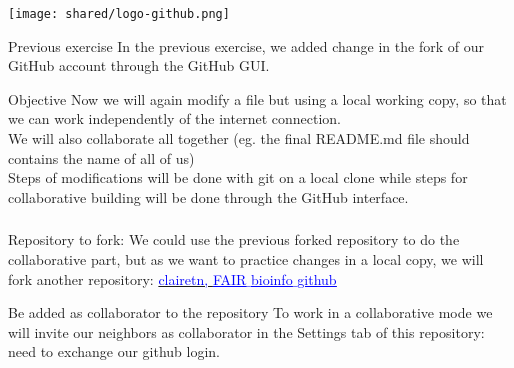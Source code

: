 \begin{frame}{\texttt{[image: shared/logo-github.png]}}
\begin{exampleblock}{Previous exercise}
In the previous exercise, we added change in the fork of our GitHub account through the GitHub GUI.
\end{exampleblock}
\begin{exampleblock}{Objective}
Now we will again modify a file but using a local working copy, so that we can work independently of the internet connection.\\
We will also collaborate all together (eg. the final README.md file should contains the name of all of us) \\
\vfill
Steps of modifications will be done with git on a local clone while steps for collaborative building will be done through the GitHub interface.
\end{exampleblock}
\end{frame}
\begin{frame}[containsverbatim]
\frametitle{}
\begin{exampleblock}{Repository to fork:}
We could use the previous forked repository to do the collaborative part, but as we want to practice changes in a local copy, we will fork another repository: \href{https://github.com/clairetn/FAIR_bioinfo_github.git}{\textcolor{blue}{clairetn, \underline{FAIR$\_$bioinfo$\_$github}}}
\end{exampleblock}
\begin{exampleblock}{Be added as collaborator to the repository}
To work in a collaborative mode we will invite our neighbors as collaborator in the Settings tab of this repository: need to exchange our github login.
\end{exampleblock}
\end{frame}

